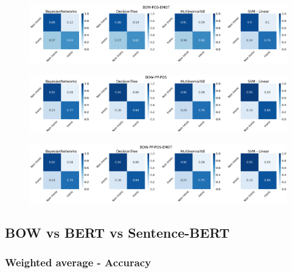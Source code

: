 \documentclass[oneside]{book}
\begin{document}
\begin{figure}[H]
	\centering
	\includegraphics[width=13cm]{assets/reports/conf-matrix/bow/bow-pos-emot.png}
\end{figure}
\vspace*{-0.8cm}

\begin{figure}[H]
	\centering
	\includegraphics[width=13cm]{assets/reports/conf-matrix/bow/bow-pp-pos.png}
\end{figure}
\vspace*{-0.8cm}

\begin{figure}[H]
	\centering
	\includegraphics[width=13cm]{assets/reports/conf-matrix/bow/bow-pp-pos-emot.png}
\end{figure}
\vspace*{-0.8cm}
\restoregeometry
\newpage

\subsection{BOW vs BERT vs Sentence-BERT}

\subsubsection{Weighted average - Accuracy}
\end{document}
